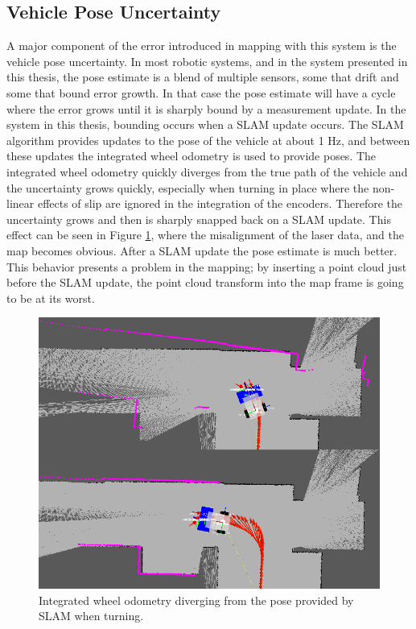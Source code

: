 \documentclass[12pt]{report}
\begin{document}
\subsection{Vehicle Pose Uncertainty}
\label{sec:uncertainty}
A major component of the error introduced in mapping with this system is the vehicle pose uncertainty.  In most robotic systems, and in the system presented in this thesis, the pose estimate is a blend of multiple sensors, some that drift and some that bound error growth.  In that case the pose estimate will have a cycle where the error grows until it is sharply bound by a measurement update.  In the system in this thesis, bounding occurs when a SLAM update occurs.  The SLAM algorithm provides updates to the pose of the vehicle at about 1 Hz, and between these updates the integrated wheel odometry is used to provide poses.  The integrated wheel odometry quickly diverges from the true path of the vehicle and the uncertainty grows quickly, especially when turning in place where the non-linear effects of slip are ignored in the integration of the encoders.  Therefore the uncertainty grows and then is sharply snapped back on a SLAM update.  This effect can be seen in Figure \ref{fig:uncertainty}, where the misalignment of the laser data, and the map becomes obvious.  After a SLAM update the pose estimate is much better.  This behavior presents a problem in the mapping; by inserting a point cloud just before the SLAM update, the point cloud transform into the map frame is going to be at its worst.

\begin{figure}[ht]
  \centering
  \includegraphics[width=6in,keepaspectratio]{uncertainty.png}
  \caption{Integrated wheel odometry diverging from the pose provided by SLAM when turning.}
  \label{fig:uncertainty}
\end{figure}
\end{document}

